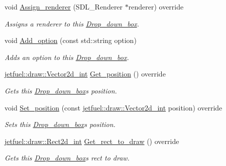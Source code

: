 \begin{DoxyCompactItemize}
void \hyperlink{classjetfuel_1_1gui_1_1Drop__down__box_a9160249744bdd278e20a77f470421d3e}{Assign\+\_\+renderer} (S\+D\+L\+\_\+\+Renderer $\ast$renderer) override
\begin{DoxyCompactList}\small\item\em Assigns a renderer to this \hyperlink{classjetfuel_1_1gui_1_1Drop__down__box}{Drop\+\_\+down\+\_\+box}. \end{DoxyCompactList}\item 
void \hyperlink{classjetfuel_1_1gui_1_1Drop__down__box_a2dd70d6c3982232965ecc9b7079b6144}{Add\+\_\+option} (const std\+::string option)
\begin{DoxyCompactList}\small\item\em Adds an option to this \hyperlink{classjetfuel_1_1gui_1_1Drop__down__box}{Drop\+\_\+down\+\_\+box}. \end{DoxyCompactList}\item 
\hyperlink{classjetfuel_1_1draw_1_1Vector2d}{jetfuel\+::draw\+::\+Vector2d\+\_\+int} \hyperlink{classjetfuel_1_1gui_1_1Drop__down__box_af92cccd010b21e1ce64af9a3c58ba086}{Get\+\_\+position} () override
\begin{DoxyCompactList}\small\item\em Gets this \hyperlink{classjetfuel_1_1gui_1_1Drop__down__box}{Drop\+\_\+down\+\_\+box}\textquotesingle{}s position. \end{DoxyCompactList}\item 
void \hyperlink{classjetfuel_1_1gui_1_1Drop__down__box_acba86706261397994c96727a0184a78c}{Set\+\_\+position} (const \hyperlink{classjetfuel_1_1draw_1_1Vector2d}{jetfuel\+::draw\+::\+Vector2d\+\_\+int} position) override
\begin{DoxyCompactList}\small\item\em Sets this \hyperlink{classjetfuel_1_1gui_1_1Drop__down__box}{Drop\+\_\+down\+\_\+box}\textquotesingle{}s position. \end{DoxyCompactList}\item 
\hyperlink{classjetfuel_1_1draw_1_1Rect2d}{jetfuel\+::draw\+::\+Rect2d\+\_\+int} \hyperlink{classjetfuel_1_1gui_1_1Drop__down__box_ab07ac526f3c2e9930398d78c7cad2d52}{Get\+\_\+rect\+\_\+to\+\_\+draw} () override
\begin{DoxyCompactList}\small\item\em Gets this \hyperlink{classjetfuel_1_1gui_1_1Drop__down__box}{Drop\+\_\+down\+\_\+box}\textquotesingle{}s rect to draw. \end{DoxyCompactList}\item 

\end{DoxyCompactItemize}
